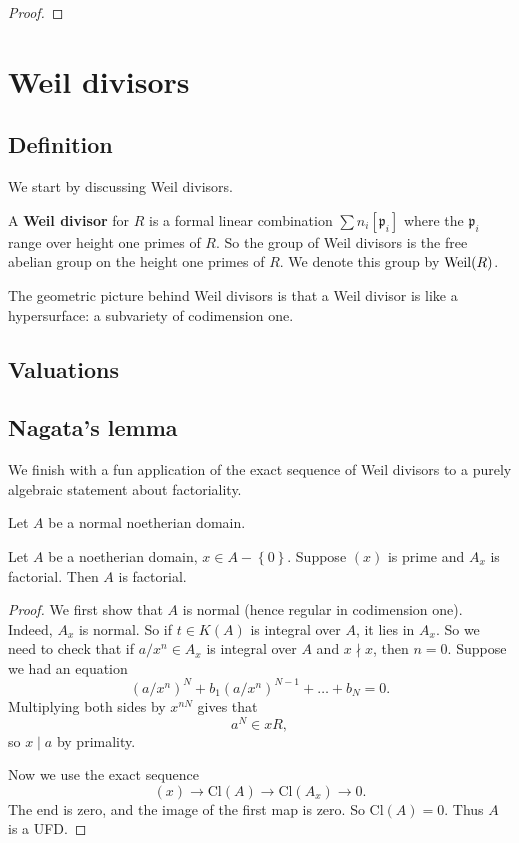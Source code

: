 \begin{proof} 
\end{proof} 

\section{Weil divisors}

\subsection{Definition}
We start by discussing Weil divisors.
\begin{definition} 
A \textbf{Weil divisor} for $R$ is a formal linear combination $\sum n_{i}
[\mathfrak{p}_i]$ where the $\mathfrak{p}_i$ range over height one primes of
$R$. So the group of Weil divisors is the free abelian group on the height one
primes of $R$. We denote this group by $\operatorname{Weil}(R)$.
\end{definition} 


The geometric picture behind Weil divisors is that a Weil divisor is like a
hypersurface: a subvariety of codimension one.

\subsection{Valuations}



\subsection{Nagata's lemma} We finish with a fun application of the exact
sequence of Weil divisors to a purely algebraic statement about factoriality.

\begin{lemma} 
Let $A$ be a normal noetherian domain. 
\end{lemma} 

\begin{theorem} 
Let $A$ be a noetherian domain, $x \in A-\left\{0\right\}$. Suppose $(x)$ is
prime and $A_x$ is factorial. Then $A$ is factorial. 
\end{theorem} 
\begin{proof} 
We first show that $A$ is normal (hence regular in codimension one).
Indeed, $A_x$ is normal. So if $t \in K(A)$ is integral over $A$, it lies in
$A_x$. 
So we need to check that if $a/x^n \in A_x$ is integral over $A$ and $x \nmid
x$, then $n=0$.
Suppose we had an equation
\[ (a/x^n)^N + b_1 (a/x^n)^{N-1} + \dots + b_N = 0.  \]
Multiplying both sides by $x^{nN}$ gives that
\[ a^N \in xR,  \]
so $x \mid a$ by primality.

Now we use the exact sequence
\[ (x) \to \mathrm{Cl}(A) \to \mathrm{Cl}(A_x) \to 0.  \]
The end is zero, and the image of the first map is zero. So
$\mathrm{Cl}(A)=0$. Thus $A$ is a UFD.
\end{proof} 





